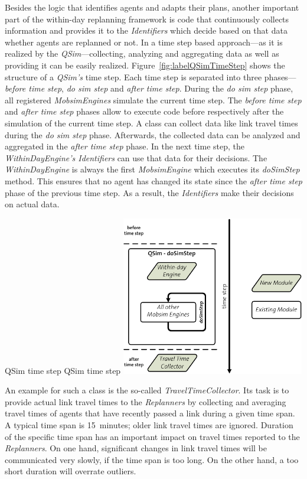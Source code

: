 Besides the logic that identifies agents and adapts their plans, another important part of the within-day replanning framework is code that continuously collects information and provides it to the \emph{Identifiers} which decide based on that data whether agents are replanned or not. In a time step based approach---as it is realized by the \emph{QSim}---collecting, analyzing and aggregating data as well as providing it can be easily realized. Figure~\ref{fig:labelQSimTimeStep} shows the structure of a \emph{QSim's} time step. Each time step is separated into three phases---\emph{before time step}, \emph{do sim step} and \emph{after time step}. During the \emph{do sim step} phase, all registered \emph{MobsimEngines} simulate the current time step. The \emph{before time step} and \emph{after time step} phases allow to execute code before respectively after the simulation of the current time step. A class can collect data like link travel times during the \emph{do sim step} phase. Afterwards, the collected data can be analyzed and aggregated in the \emph{after time step} phase. In the next time step, the \emph{WithinDayEngine's Identifiers} can use that data for their decisions. The \emph{WithinDayEngine} is always the first \emph{MobsimEngine} which executes its \emph{doSimStep} method. This ensures that no agent has changed its state since the \emph{after time step} phase of the previous time step. As a result, the \emph{Identifiers} make their decisions on actual data.

\createfigure%
{QSim time step}%
{QSim time step}%
{\label{fig:labelQSimTimeStep}}%
{\includegraphics[width=8.0cm, angle=0]{extending/figures/WithinDayReplanning/QSimTimeStep}}%
{}

An example for such a class is the so-called \emph{TravelTimeCollector}. Its task is to provide actual link travel times to the \emph{Replanners} by collecting and averaging travel times of agents that have recently passed a link during a given time span. A typical time span is 15~minutes; older link travel times are ignored. Duration of the specific time span has an important impact on travel times reported to the \emph{Replanners}. On one hand, significant changes in link travel times will be communicated very slowly, if the time span is too long. On the other hand, a too short duration will overrate outliers.

